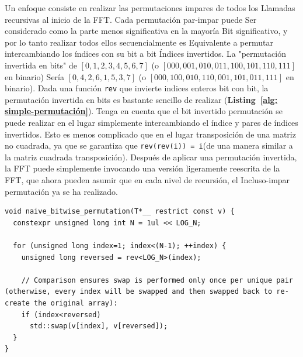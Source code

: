 ﻿\documentclass[10pt]{article}
\begin{document}
Un enfoque consiste en realizar las permutaciones impares de todos los
Llamadas recursivas al inicio de la FFT. Cada permutación par-impar puede
Ser considerado como la parte menos significativa en la mayoría
Bit significativo, y por lo tanto realizar todos ellos secuencialmente es
Equivalente a permutar intercambiando los índices con su bit a bit
Índices invertidos. La "permutación invertida en bits" de $[0, 1, 2, 3, 4, 5, 6, 7]$ (o $[000, 001, 010, 011, 100, 101, 110, 111]$ en binario)
Sería $[0, 4, 2, 6, 1, 5, 3, 7]$ (o $[000, 100, 010, 110, 001, 101, 011, 111] $ en binario). Dada una función {\tt rev} que invierte indices enteros bit con bit, la permutación invertida en bits es bastante sencillo de realizar ({\bf Listing~\ref{alg: simple-permutación}}). Tenga en cuenta que el bit invertido permutación se puede realizar en el lugar simplemente intercambiando el índice y pares de índices invertidos. Esto es menos complicado que en el lugar transposición de una matriz no cuadrada, ya que se garantiza que {\tt rev(rev(i)) = i}(de una manera similar a la matriz cuadrada transposición). Después de aplicar una permutación invertida, la FFT puede simplemente invocando una versión ligeramente reescrita de la
FFT, que ahora pueden asumir que en cada nivel de recursión, el
Incluso-impar permutación ya se ha realizado.
\begin{footnotesize}
\begin{lstlisting}[label={alg:simple-permutation},caption={{\bf Performing the bit-reversed permutation with the help of an external {\tt rev} function.} Let {\tt LOG\_N} be the problem size, which is a {\tt constexpr} (\emph{i.e.}, it is known a constant known at compile time). Note that the function {\tt rev} is templated to take the word size used for reversal.}]
void naive_bitwise_permutation(T*__ restrict const v) {
  constexpr unsigned long int N = 1ul << LOG_N;

  for (unsigned long index=1; index<(N-1); ++index) {
    unsigned long reversed = rev<LOG_N>(index);

    // Comparison ensures swap is performed only once per unique pair (otherwise, every index will be swapped and then swapped back to re-create the original array):
    if (index<reversed)
      std::swap(v[index], v[reversed]);
  }
}
\end{lstlisting}
\end{footnotesize}
\end{document}
